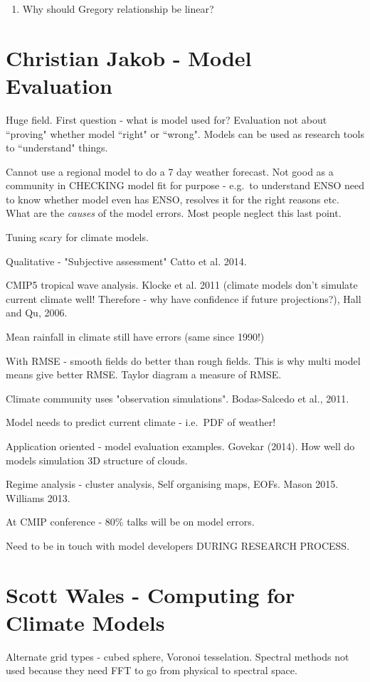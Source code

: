 \documentclass[12pt]{article}
\begin{document}
\begin{enumerate}
\item
Why should Gregory relationship be linear?
\end{enumerate}

\section{Christian Jakob - Model Evaluation}
Huge field. First question - what is model used for? Evaluation not about ``proving" whether model ``right" or ``wrong". Models can be used as research tools to ``understand" things. 

Cannot use a regional model to do a 7 day weather forecast. Not good as a community in CHECKING model fit for purpose - e.g.~to understand ENSO need to know whether model even has ENSO, resolves it for the right reasons etc. What are the \textit{causes} of the model errors. Most people neglect this last point. 

Tuning scary for climate models. 

Qualitative - "Subjective assessment" Catto et al. 2014. 

CMIP5 tropical wave analysis. Klocke et al. 2011 (climate models don't simulate current climate well! Therefore - why have confidence if future projections?), Hall and Qu, 2006. 

Mean rainfall in climate still have errors (same since 1990!) 

With RMSE - smooth fields do better than rough fields. This is why multi model means give better RMSE. Taylor diagram a measure of RMSE. 

Climate community uses "observation simulations". Bodas-Salcedo et al., 2011.

Model needs to predict current climate - i.e.~PDF of weather!

Application oriented - model evaluation examples. Govekar (2014). How well do models simulation 3D structure of clouds.

Regime analysis - cluster analysis, Self organising maps, EOFs. Mason 2015. Williams 2013. 

At CMIP conference - 80\% talks will be on model errors. 

Need to be in touch with model developers DURING RESEARCH PROCESS.  

\section{Scott Wales - Computing for Climate Models}
Alternate grid types - cubed sphere, Voronoi tesselation. Spectral methods not used because they need FFT to go from physical to spectral space.
\end{document}
